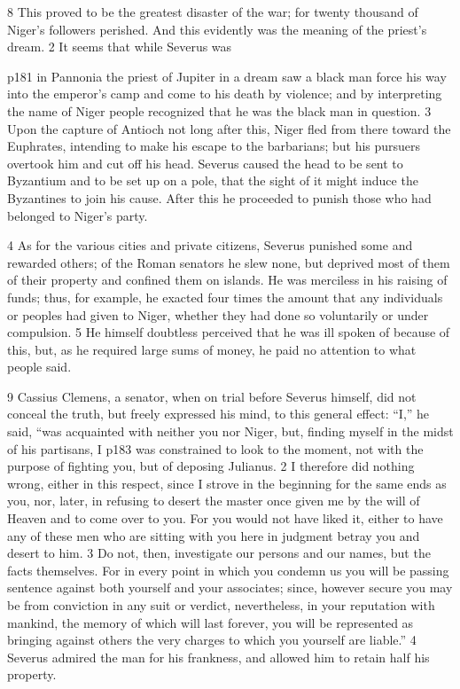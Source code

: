 8
This proved to be the greatest disaster of the war; for twenty thousand of Niger's followers perished. And this evidently was the meaning of the priest's dream. 2 It seems that while Severus was

p181 in Pannonia the priest of Jupiter in a dream saw a black man force his way into the emperor's camp and come to his death by violence; and by interpreting the name of Niger people recognized that he was the black man in question. 3 Upon the capture of Antioch not long after this, Niger fled from there toward the Euphrates, intending to make his escape to the barbarians; but his pursuers overtook him and cut off his head. Severus caused the head to be sent to Byzantium and to be set up on a pole, that the sight of it might induce the Byzantines to join his cause. After this he proceeded to punish those who had belonged to Niger's party.

4
As for the various cities and private citizens, Severus punished some and rewarded others; of the Roman senators he slew none, but deprived most of them of their property and confined them on islands. He was merciless in his raising of funds; thus, for example, he exacted four times the amount that any individuals or peoples had given to Niger, whether they had done so voluntarily or under compulsion. 5 He himself doubtless perceived that he was ill spoken of because of this, but, as he required large sums of money, he paid no attention to what people said.

9
Cassius Clemens, a senator, when on trial before Severus himself, did not conceal the truth, but freely expressed his mind, to this general effect: ``I,'' he said, ``was acquainted with neither you nor Niger, but, finding myself in the midst of his partisans, I p183 was constrained to look to the moment, not with the purpose of fighting you, but of deposing Julianus. 2 I therefore did nothing wrong, either in this respect, since I strove in the beginning for the same ends as you, nor, later, in refusing to desert the master once given me by the will of Heaven and to come over to you. For you would not have liked it, either to have any of these men who are sitting with you here in judgment betray you and desert to him. 3 Do not, then, investigate our persons and our names, but the facts themselves. For in every point in which you condemn us you will be passing sentence against both yourself and your associates; since, however secure you may be from conviction in any suit or verdict, nevertheless, in your reputation with mankind, the memory of which will last forever, you will be represented as bringing against others the very charges to which you yourself are liable.'' 4 Severus admired the man for his frankness, and allowed him to retain half his property.

